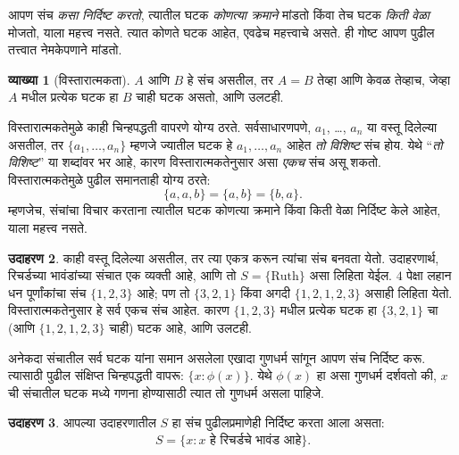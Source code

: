 \documentclass[11pt,a4paper,openany]{book}
\theoremstyle{definition}
\newtheorem{defn}{व्याख्या}[section]
\newtheorem{ex}[defn]{उदाहरण}
\newenvironment{explain}{}{}
\newcommand{\Setabs}[2]{\{#1:#2\}}
\begin{document}
\begin{explain}
आपण संच \emph{कसा निर्दिष्ट करतो}, त्यातील घटक \emph{कोणत्या क्रमाने}
मांडतो किंवा तेच घटक \emph{किती वेळा} मोजतो, याला महत्त्व नसते.
त्यात कोणते घटक आहेत, एवढेच महत्त्वाचे असते. ही गोष्ट आपण पुढील
तत्त्वात नेमकेपणाने मांडतो.
\end{explain}

\begin{defn}[विस्तारात्मकता]
  $A$ आणि $B$ हे संच असतील, तर $A = B$ तेव्हा आणि केवळ तेव्हाच, जेव्हा
  $A$ मधील प्रत्येक घटक हा $B$ चाही घटक असतो, आणि उलटही.
\end{defn}

विस्तारात्मकतेमुळे काही चिन्हपद्धती वापरणे योग्य ठरते. सर्वसाधारणपणे,
$a_{1}$, \dots, $a_{n}$ या वस्तू दिलेल्या असतील, तर
$\{a_{1}, \dots, a_{n}\}$ म्हणजे ज्यातील घटक हे
$a_1, \ldots, a_n$ आहेत \emph{तो विशिष्ट} संच होय. येथे ``\emph{तो विशिष्ट}''
या शब्दांवर भर आहे, कारण विस्तारात्मकतेनुसार असा \emph{एकच} संच असू शकतो.
विस्तारात्मकतेमुळे पुढील समानताही योग्य ठरते:
  \[
    \{a, a, b\} = \{a, b\} = \{b,a\}.
  \]
म्हणजेच, संचांचा विचार करताना त्यातील घटक कोणत्या क्रमाने किंवा
किती वेळा निर्दिष्ट केले आहेत, याला महत्त्व नसते.


\begin{ex}
काही वस्तू दिलेल्या असतील, तर त्या एकत्र करून त्यांचा संच बनवता येतो.
उदाहरणार्थ, रिचर्डच्या भावंडांच्या संचात एक व्यक्ती आहे, आणि तो
$S=\{\textrm{Ruth}\}$ असा लिहिता येईल.
$4$ पेक्षा लहान धन पूर्णांकांचा संच $\{1, 2, 3\}$ आहे; पण तो
$\{3, 2, 1\}$ किंवा अगदी $\{1, 2, 1, 2, 3\}$ असाही लिहिता येतो.
विस्तारात्मकतेनुसार हे सर्व एकच संच आहेत. कारण $\{1, 2, 3\}$ मधील
प्रत्येक घटक हा $\{3, 2, 1\}$ चा (आणि $\{1,
2, 1, 2, 3\}$ चाही) घटक आहे, आणि उलटही.
\end{ex}


अनेकदा संचातील सर्व घटक यांना समान असलेला एखादा गुणधर्म सांगून आपण
संच निर्दिष्ट करू. त्यासाठी पुढील संक्षिप्त चिन्हपद्धती वापरू:
$\Setabs{x}{\phi(x)}$. येथे $\phi(x)$ हा असा गुणधर्म दर्शवतो की,
$x$ ची संचातील घटक मध्ये गणना होण्यासाठी त्यात तो गुणधर्म असला पाहिजे.


\begin{ex}
आपल्या उदाहरणातील $S$ हा संच पुढीलप्रमाणेही निर्दिष्ट करता आला असता:
\[
S = \Setabs{x}{x \text{ हे रिचर्डचे भावंड आहे}}.
\]
\end{ex}
\end{document}
